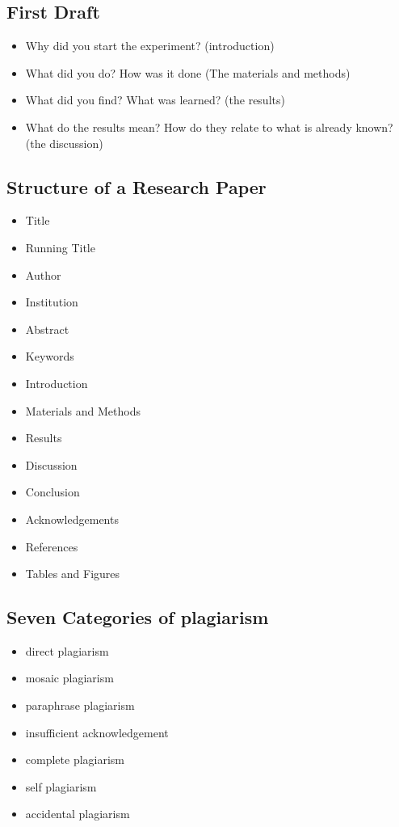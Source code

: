 \documentclass[
  letterpaper,
  DIV=11,
  numbers=noendperiod]{scrreprt}
\providecommand{\tightlist}{%
  \setlength{\itemsep}{0pt}\setlength{\parskip}{0pt}}\usepackage{longtable,booktabs,array}
\begin{document}
\subsection{First Draft}\label{first-draft}

\begin{itemize}
\tightlist
\item
  Why did you start the experiment? (introduction)
\item
  What did you do? How was it done (The materials and methods)
\item
  What did you find? What was learned? (the results)
\item
  What do the results mean? How do they relate to what is already known?
  (the discussion)
\end{itemize}

\subsection{Structure of a Research
Paper}\label{structure-of-a-research-paper}

\begin{itemize}
\tightlist
\item
  Title
\item
  Running Title
\item
  Author
\item
  Institution
\item
  Abstract
\item
  Keywords
\item
  Introduction
\item
  Materials and Methods
\item
  Results
\item
  Discussion
\item
  Conclusion
\item
  Acknowledgements
\item
  References
\item
  Tables and Figures
\end{itemize}

\subsection{Seven Categories of
plagiarism}\label{seven-categories-of-plagiarism}

\begin{itemize}
\tightlist
\item
  direct plagiarism
\item
  mosaic plagiarism
\item
  paraphrase plagiarism
\item
  insufficient acknowledgement
\item
  complete plagiarism
\item
  self plagiarism
\item
  accidental plagiarism
\end{itemize}
\end{document}
